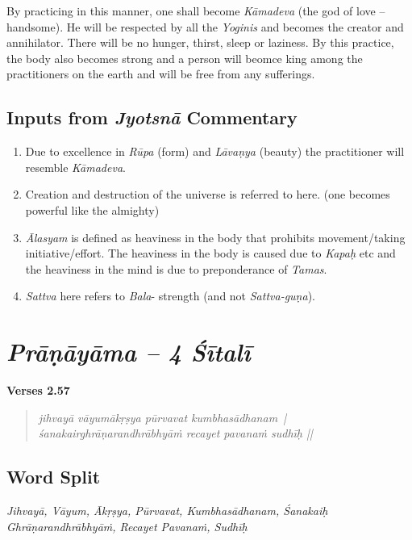 By practicing in this manner, one shall become \textit{Kāmadeva} (the god of love – handsome). He will be respected by all the \textit{Yoginis} and becomes the creator and annihilator. There will be no hunger, thirst, sleep or laziness. By this practice, the body also becomes strong and a person will beomce king among the practitioners on the earth and will be free from any sufferings.

\subsection*{Inputs from \textit{Jyotsnā} Commentary}
\vspace{-5pt}

\begin{enumerate}
\itemsep=0pt
\item Due to excellence in \textit{Rūpa} (form) and \textit{Lāvaṇya} (beauty) the practitioner  will resemble \textit{Kāmadeva}. 
\item Creation and destruction of the universe is referred to here. (one becomes powerful like the almighty)
\item \textit{Ālasyam} is defined as heaviness in the body that prohibits movement/taking initiative/effort. The heaviness in the body is caused due to \textit{Kapaḥ} etc and the heaviness in the mind is due to preponderance of \textit{Tamas}. 
\item \textit{Sattva} here refers to \textit{Bala}- strength (and not \textit{Sattva-guṇa}). 
\end{enumerate}

\section*{\textit{Prāṇāyāma -- 4 Śītalī}}

\noindent \textbf{Verses 2.57}

\begin{verse}
\textit{jihvayā vāyumākṛṣya pūrvavat kumbhasādhanam |\\
śanakairghrāṇarandhrābhyāṁ recayet pavanaṁ sudhīḥ ||}
\end{verse}

\subsection*{Word Split}

\textit{Jihvayā, Vāyum, Ākṛṣya, Pūrvavat, Kumbhasādhanam, Śanakaiḥ Ghrāṇarandhrābhyāṁ, Recayet Pavanaṁ, Sudhīḥ}

